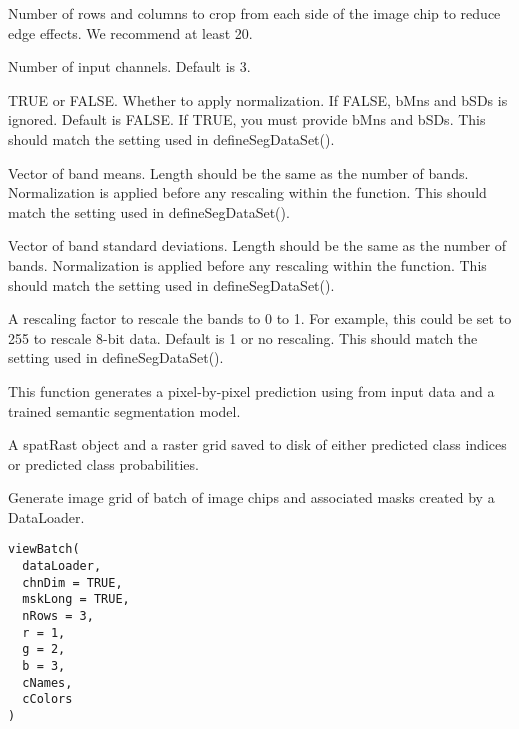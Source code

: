 \documentclass[a4paper]{book}
\begin{document}
\begin{Arguments}
\begin{ldescription}
\item[\code{crop}] Number of rows and columns to crop from each side of the image chip
to reduce edge effects. We recommend at least 20.

\item[\code{nChn}] Number of input channels. Default is 3.

\item[\code{normalize}] TRUE or FALSE. Whether to apply normalization. If FALSE,
bMns and bSDs is ignored. Default is FALSE. If TRUE, you must provide bMns
and bSDs. This should match the setting used in defineSegDataSet().

\item[\code{bMns}] Vector of band means. Length should be the same as the number of bands.
Normalization is applied before any rescaling within the function. This should
match the setting used in defineSegDataSet().

\item[\code{bSDs}] Vector of band standard deviations. Length should be the same
as the number of bands. Normalization is applied before any rescaling within
the function. This should match the setting used in defineSegDataSet().

\item[\code{rescale}] A rescaling factor to rescale the bands to 0 to 1. For
example, this could be set to 255 to rescale 8-bit data. Default is 1 or no
rescaling. This should match the setting used in defineSegDataSet().
\end{ldescription}
\end{Arguments}
%
\begin{Details}\relax
This function generates a pixel-by-pixel prediction using from input data and a
trained semantic segmentation model.
\end{Details}
%
\begin{Value}
A spatRast object and a raster grid saved to disk of either predicted
class indices or predicted class probabilities.
\end{Value}
%
\begin{Description}\relax
Generate image grid of batch of image chips and associated masks created by a DataLoader.
\end{Description}
%
\begin{Usage}
\begin{verbatim}
viewBatch(
  dataLoader,
  chnDim = TRUE,
  mskLong = TRUE,
  nRows = 3,
  r = 1,
  g = 2,
  b = 3,
  cNames,
  cColors
)
\end{verbatim}
\end{Usage}
\end{document}

